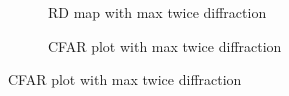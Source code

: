 \documentclass[12pt,DIV14,BCOR12mm,a4paper,footinclude=false,headinclude,parskip=half-,twoside,openright,cleardoublepage=empty,toc=index,bibliography=totoc,listof=totoc]{scrreprt}
\numberwithin{equation}{chapter}
\begin{document}
\begin{figure}[t]
\begin{subfigure}{0.45\textwidth}
        \end{subfigure}
        \begin{subfigure}{0.45\textwidth}
            \centering
            \caption{RD map with max twice diffraction}
        \end{subfigure}\hspace{0.5cm}
        \begin{subfigure}{0.45\textwidth}
            \centering
            \caption{CFAR plot with max twice diffraction}
        \end{subfigure}

\end{figure}
\end{document}
